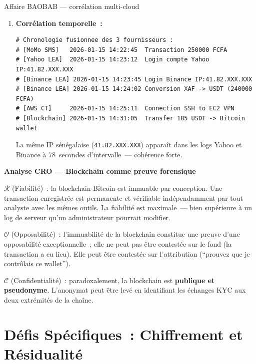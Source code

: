 \begin{boxscenario}{Affaire BAOBAB --- corrélation multi-cloud}
\begin{enumerate}
    \item \textbf{Corrélation temporelle~:}
\begin{lstlisting}[language=bash_forensique]
# Chronologie fusionnee des 3 fournisseurs :
# [MoMo SMS]   2026-01-15 14:22:45  Transaction 250000 FCFA
# [Yahoo LEA]  2026-01-15 14:23:12  Login compte Yahoo IP:41.82.XXX.XXX
# [Binance LEA] 2026-01-15 14:23:45 Login Binance IP:41.82.XXX.XXX
# [Binance LEA] 2026-01-15 14:24:02 Conversion XAF -> USDT (240000 FCFA)
# [AWS CT]     2026-01-15 14:25:11  Connection SSH to EC2 VPN
# [Blockchain] 2026-01-15 14:31:05  Transfer 185 USDT -> Bitcoin wallet
\end{lstlisting}
          La même IP sénégalaise (\texttt{41.82.XXX.XXX}) apparaît
          dans les logs Yahoo et Binance à 78~secondes d'intervalle~---
          cohérence forte.
    \end{enumerate}
\end{boxscenario}

\begin{boxCRO}
\textbf{Analyse CRO --- Blockchain comme preuve forensique}

$\mathcal{R}$ (Fiabilité)~: la blockchain Bitcoin est immuable par
conception. Une transaction enregistrée est permanente et vérifiable
indépendamment par tout analyste avec les mêmes outils. La fiabilité
est maximale~--- bien supérieure à un log de serveur qu'un administrateur
pourrait modifier.

$\mathcal{O}$ (Opposabilité)~: l'immuabilité de la blockchain constitue
une preuve d'une opposabilité exceptionnelle~; elle ne peut pas être
contestée sur le fond (la transaction a eu lieu). Elle peut être
contestée sur l'attribution (``prouvez que je contrôlais ce wallet'').

$\mathcal{C}$ (Confidentialité)~: paradoxalement, la blockchain est
\textbf{publique et pseudonyme}. L'anonymat peut être levé en
identifiant les échanges KYC aux deux extrémités de la chaîne.

\end{boxCRO}

\section{Défis Spécifiques~: Chiffrement et Résidualité}
\label{sec:defis-cloud}

